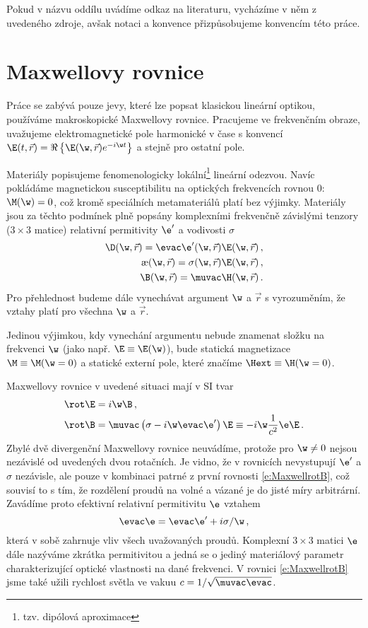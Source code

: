 Pokud v názvu oddílu uvádíme odkaz na literaturu, vycházíme v něm z uvedeného zdroje, avšak notaci a konvence přizpůsobujeme konvencím této práce.

\section{Maxwellovy rovnice \cite{Bornwolf}}
Práce se zabývá pouze jevy, které lze popsat klasickou lineární optikou, používáme makroskopické Maxwellovy rovnice.
Pracujeme ve frekvenčním obraze, uvažujeme elektromagnetické pole harmonické v čase s konvencí $\E(t,\vec{r})=\Re\left\lbrace\E(\w,\vec{r}) e^{-i\w t}\right\rbrace$ a stejně pro ostatní pole.

Materiály popisujeme fenomenologicky lokální\footnote{tzv. dipólová aproximace} lineární odezvou. 
Navíc pokládáme magnetickou susceptibilitu na optických frekvencích rovnou 0: $\M(\w)=0$, což kromě speciálních metamateriálů platí bez výjimky\cite{muvac1}.
Materiály jsou za těchto podmínek plně popsány komplexními frekvenčně závislými tenzory ($3\times 3$ matice) relativní permitivity  $\e'$ a vodivosti $\sigma$
\begin{align}
\D(\w,\vec{r})=\evac\e'(\w,\vec{r})\E(\w,\vec{r}) \,, \label{e:materialyD} \\
\j(\w,\vec{r})=\sigma(\w,\vec{r})\E(\w,\vec{r}) \,, \\
\B(\w,\vec{r})=\muvac \H(\w,\vec{r}) \label{e:materialyB} \,.
\end{align}
Pro přehlednost budeme dále vynechávat argument $\w$ a $\vec{r}$ s vyrozuměním, že vztahy platí pro všechna $\w$ a $\vec{r}$.

Jedinou výjimkou, kdy vynechání argumentu nebude znamenat složku na frekvenci $\w$ (jako např. $\E\equiv\E(\w)$), bude statická magnetizace $\M\equiv\M(\w=0)$ a statické externí pole, které značíme $\Hext\equiv\H(\w=0)$.

Maxwellovy rovnice v uvedené situaci mají v SI tvar 
\begin{align}
\rot \E&=i\w\B \,, \\
\rot \B&=\muvac \left( \sigma - i\w \evac\e' \right) \E \equiv -i\w\frac{1}{c^2}\e \E \,. \label{e:MaxwellrotB}
\end{align}
Zbylé dvě divergenční Maxwellovy rovnice neuvádíme, protože pro $\w\neq0$ nejsou nezávislé od uvedených dvou rotačních\cite{Visvlakna}.
Je vidno, že v rovnicích nevystupují $\e'$ a $\sigma$ nezávisle, ale pouze v kombinaci patrné z první rovnosti \eqref{e:MaxwellrotB}, což souvisí to s tím, že rozdělení proudů na volné a vázané je do jisté míry arbitrární.
Zavádíme proto efektivní relativní permitivitu $\e$ vztahem 
\begin{equation}
\evac \e=\evac\e'+i\sigma/\w \,,
\end{equation}
která v sobě zahrnuje vliv všech uvažovaných proudů.
Komplexní $3\times 3$ matici $\e$ dále nazýváme zkrátka permitivitou a jedná se o jediný materiálový parametr charakterizující optické vlastnosti na dané frekvenci.
V rovnici \eqref{e:MaxwellrotB} jsme také užili rychlost světla ve vakuu $c=1/\sqrt{\muvac\evac}$.


